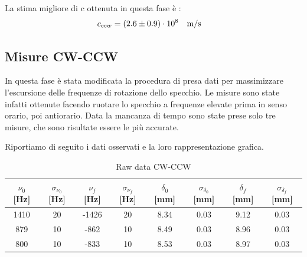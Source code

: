 \documentclass[openright]{article}
\begin{document}
    
    La stima migliore di c ottenuta in questa fase è :
    \[ c_{ccw} = (2.6 \pm 0.9)\cdot10^8 \qq {m/s} \] 

        
    
    \subsection{Misure CW-CCW}

    In questa fase è stata modificata la procedura di presa dati per massimizzare l'escursione delle frequenze di rotazione dello specchio. Le misure sono state infatti ottenute facendo ruotare lo specchio a frequenze elevate prima in senso orario, poi antiorario. Data la mancanza di tempo sono state prese solo tre misure, che sono risultate essere le più accurate. 
    
    Riportiamo di seguito i dati osservati e la loro rappresentazione grafica.

    
    
    \begin{table}[H]
        \centering
        \begin{tabular}{ cccccccc } 
            \toprule
            $\nu_0$ [Hz] & $\sigma_{\nu_0}$ [Hz] & $\nu_f$ [Hz] &  $\sigma_{\nu_f}$ [Hz] & $\delta_0$ [mm] & $\sigma_{\delta_0}$ [mm] & $\delta_f$ [mm] & $\sigma_{\delta_f}$ [mm] \\ 
            \midrule
             1410 & 20 & -1426 & 20 & 8.34 & 0.03 & 9.12 & 0.03  \\ 
            879 & 10 & -862 & 10 & 8.49 & 0.03 & 8.96 & 0.03  \\ 
            800 & 10 & -833 & 10 & 8.53 & 0.03 & 8.97 & 0.03  \\ 

            \bottomrule           \end{tabular}
        \caption{Raw data CW-CCW}
    \end{table}

    
\end{document}
